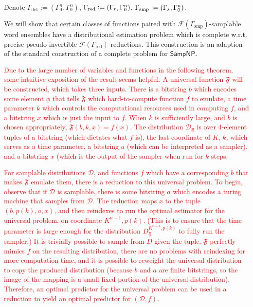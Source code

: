 \documentclass[11pt]{article}
\numberwithin{equation}{section}
\theoremstyle{definition}
\theoremstyle{plain}
\newcommand{\Dist}{\mathcal{D}}
\newcommand{\Fall}{\mathcal{F}}
\begin{document}
Denote ${\Gamma_\text{det}:=(\Gamma_0^n,\Gamma_0^n)}$, ${\Gamma_{\textnormal{red}}:=(\Gamma_{r},\Gamma_0^n)}$, ${\Gamma_{\textnormal{smp}}:=(\Gamma_{s},\Gamma_0^n)}$.

We will show that certain classes of functions paired with ${\Fall(\Gamma_{\text{smp}})}$-samplable word ensembles have a distributional estimation problem which is complete w.r.t. precise pseudo-invertible ${\Fall(\Gamma_{\text{red}})}$-reductions. This construction is an adaption of the standard construction of a complete problem for ${\mathsf{SampNP}}$.

\textcolor{red}{Due to the large number of variables and functions in the following theorem, some intuitive exposition of the result seems helpful. A universal function $\mathfrak{F}$ will be constructed, which takes three inputs. There is a bitstring $b$ which encodes some element $\phi$ that tells $\mathfrak{F}$ which hard-to-compute function $f$ to emulate, a time parameter $k$ which controls the computational resources used in computing $f$, and a bitstring $x$ which is just the input to $f$. When $k$ is sufficiently large, and $b$ is chosen appropriately, $\mathfrak{F}(b,k,x)=f(x)$. The distribution $\Dist_{\mathfrak{F}}$ is over 4-element tuples of a bitstring (which dictates what $f$ is), the last coordinate of $K$, $k$, which serves as a time parameter, a bitstring $a$ (which can be interpreted as a sampler), and a bitstring $x$ (which is the output of the sampler when run for $k$ steps.}

\textcolor{red}{For samplable distributions $\Dist$, and functions $f$ which have a corresponding $b$ that makes $\mathfrak{F}$ emulate them, there is a reduction to this universal problem. To begin, observe that if $\Dist$ is samplable, there is some bitstring $a$ which encodes a turing machine that samples from $\Dist$. The reduction maps $x$ to the tuple $(b,p(k),a,x)$, and then reindexes to run the optimal estimator for the universal problem, on coordinate $K^{n-1},p(k)$. (This is to ensure that the time parameter is large enough for the distribution $D_{\mathfrak{F}}^{K^{n-1},p(k)}$ to fully run the sampler.) It is trivially possible to sample from $D$ given the tuple, $\mathfrak{F}$ perfectly mimics $f$ on the resulting distribution, there are no problems with reindexing for more computation time, and it is possible to reweight the universal distribution to copy the produced distribution (because $b$ and $a$ are finite bitstrings, so the image of the mapping is a small fixed portion of the universal distribution). Therefore, an optimal predictor for the universal problem can be used in a reduction to yield an optimal predictor for $(\Dist,f)$.}
\end{document}
